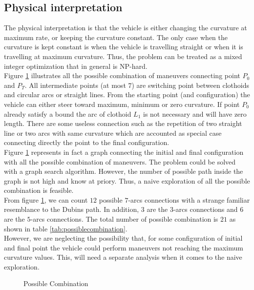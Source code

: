 \documentclass[11pt,twocolumn]{scrartcl}
\begin{document}
\subsection*{Physical interpretation}
%
The physical interpretation is that the vehicle is either changing the curvature at maximum rate, or keeping the curvature constant.
The only case when the curvature is kept constant is when the vehicle is travelling straight or when it is travelling at maximum curvature.
Thus, the problem can be treated as a mixed integer optimization that in general is NP-hard.\\
%
Figure \ref{fig:possiblecombination} illustrates all the possible combination of maneuvers connecting point $P_0$ and $P_T$. All intermediate points (at most $7$) are switching point between clothoids and circular arcs or straight lines. From the starting point (and configuration) the vehicle can either steer toward maximum, minimum or zero curvature. If point $P_0$ already satisfy a bound the arc of clothoid $L_1$ is not necessary and will have zero length.
There are some useless connection such as the repetition of two straight line or two arcs with same curvature which are accounted as special case connecting directly the point to the final configuration.\\
%
Figure \ref{fig:possiblecombination} represents in fact a graph connecting the initial and final configuration with all the possible combination of maneuvers. The problem could be solved with a graph search algorithm. However, the number of possible path inside the graph is not high and know at priory. Thus, a naive exploration of all the possible combination is feasible.\\
%
From figure \ref{fig:possiblecombination}, we can count $12$ possible $7$-arcs connections with a strange familiar resemblance to the Dubins path. In addition, $3$ are the $3$-arcs connections and $6$ are the $5$-arcs connections. The total number of possible combination is $21$ as shown in table \ref{tab:possiblecombination}.\\
%
However, we are neglecting the possibility that, for some configuration of initial and final point the vehicle could perform maneuvers not reaching the maximum curvature values. This, will need a separate analysis when it comes to the naive exploration.  
%
\begin{figure}[ht]
  \centering
  \resizebox{1.1\linewidth}{!}{%
  }%
  \caption{Possible Combination}
  \label{fig:possiblecombination}
\end{figure}
\end{document}
